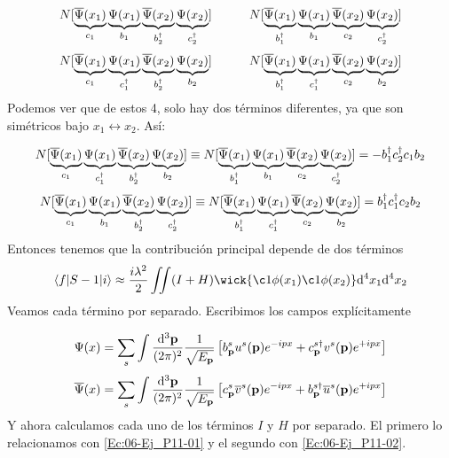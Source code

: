 \begin{solucion}
	\begin{equation*}
		N[\underbrace{ \overline{\Psi} (x_1)}_{c_1}  \underbrace{ \Psi (x_1)}_{b_1}\underbrace{ \overline{\Psi} (x_2)}_{b^\dagger_2} \underbrace{ \Psi (x_2)}_{c^\dagger_2} ] \quad \quad \quad
		N[ \underbrace{ \overline{\Psi} (x_1)}_{b^\dagger_1}\underbrace{ \Psi (x_1)}_{b_1} \underbrace{ \overline{\Psi} (x_2)}_{c_2} \underbrace{ \Psi (x_2)}_{c^\dagger_2} ]
	\end{equation*}
	\begin{equation*}
		N[{ \underbrace{ \overline{\Psi} (x_1)}_{c_1}\underbrace{ \Psi (x_1)}_{c^\dagger_1}  \underbrace{ \overline{\Psi} 	(x_2)}_{b^\dagger_2} \underbrace{ \Psi (x_2)}_{b_2}}] \quad \quad \quad
		N[{\underbrace{ \overline{\Psi} (x_1)}_{b^\dagger_1}\underbrace{ \Psi (x_1)}_{c^\dagger_1}  \underbrace{ \overline{\Psi} 	(x_2)}_{c_2} \underbrace{ \Psi (x_2)}_{b_2} }]
	\end{equation*}
	Podemos ver que de estos 4, solo hay dos términos diferentes, ya que son simétricos bajo $x_1 \leftrightarrow x_2 $. Así:
	
	\begin{equation}
		N[ \underbrace{ \overline{\Psi} (x_1)}_{c_1}\underbrace{ \Psi (x_1)}_{c^\dagger_1}  \underbrace{ \overline{\Psi} 	(x_2)}_{b^\dagger_2} \underbrace{ \Psi (x_2)}_{b_2}] \equiv
		N[\underbrace{ \overline{\Psi} (x_1)}_{b^\dagger_1}\underbrace{ \Psi (x_1)}_{b_1} \underbrace{ \overline{\Psi} 	(x_2)}_{c_2} \underbrace{ \Psi (x_2)}_{c^\dagger_2} ] = - b_1^\dagger c_2^\dagger c_1 b_2 \label{Ec:06-Ej_P11-01}
	\end{equation}
	\begin{equation}
		N[\underbrace{ \overline{\Psi} (x_1)}_{c_1}  \underbrace{ \Psi (x_1)}_{b_1}\underbrace{ \overline{\Psi} 	(x_2)}_{b^\dagger_2} \underbrace{ \Psi (x_2)}_{c^\dagger_2}]\equiv
		N[\underbrace{ \overline{\Psi} (x_1)}_{b^\dagger_1}\underbrace{ \Psi (x_1)}_{c^\dagger_1}  \underbrace{ \overline{\Psi} 	(x_2)}_{c_2} \underbrace{ \Psi (x_2)}_{b_2}] = b_1^\dagger c_1^\dagger c_2 b_2 \label{Ec:06-Ej_P11-02}
	\end{equation}
	Entonces tenemos que la contribución principal depende de dos términos
	\begin{equation*}
		\mel**{f}{S-1}{i}  \approx \frac{i\lambda^2}{2}\iint ( I + H ) \wick{\c1{\phi}(x_1)\c1{\phi} (x_2)} \D^4 x_1 \D^4 x_2
	\end{equation*}
	Veamos cada término por separado. Escribimos los campos explícitamente
	
	\begin{equation}
		\Psi (x) = \sum_s \int \frac{\mathrm{d}^3\mathbf{p}}{(2\pi)^2} \frac{1}{\sqrt{E_{\mathbf{p}}}} \left[ b_{\mathbf{p}}^s u^s (\mathbf{p}) e^{-ipx}+c^{s \dagger}_{\mathbf{p}} v^s (\mathbf{p}) e^{+ipx} \right]
	\end{equation}                
	\begin{equation}
		\overline{\Psi} (x) = \sum_s \int \frac{\mathrm{d}^3\mathbf{p}}{(2\pi)^2} \frac{1}{\sqrt{E_{\mathbf{p}}}} \left[ c_{\mathbf{p}}^s \overline{v}^s (\mathbf{p}) e^{-ipx}+b^{s \dagger}_{\mathbf{p}} \overline{u}^s (\mathbf{p}) e^{+ipx} \right]
	\end{equation}              
	Y ahora calculamos cada uno de los términos $I$ y $H$ por separado. El primero lo relacionamos con \ref{Ec:06-Ej_P11-01} y el segundo con \ref{Ec:06-Ej_P11-02}.
	

\end{solucion}
